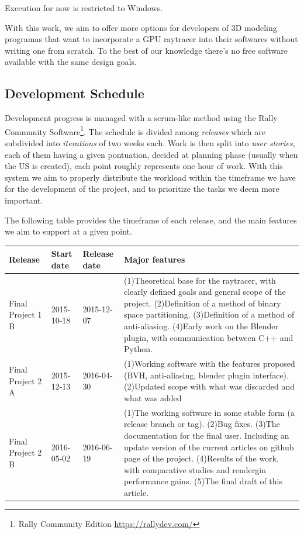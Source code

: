 \documentclass[a4paper]{sbgames}               %
\begin{document}
Execution for now is restricted to Windows.

With this work, we aim to offer more options for developers of 3D
modeling programas that want to incorporate a GPU raytracer into their
softwares without writing one from scratch. To the best of our
knowledge there's no free software available with the same design
goals.

\subsection{Development Schedule}

Development progress is managed with a scrum-like method using the
Rally Community Software\footnote{Rally Community Edition
 \url{https://rallydev.com/}}. The schedule is divided among
\emph{releases} which are subdivided into \emph{iterations} of two
weeks each. Work is then split into \emph{user stories}, each of them
having a given pontuation, decided at planning phase (usually when the
US is created), each point roughly represents one hour of work. With
this system we aim to properly distribute the workload within the
timeframe we have for the development of the project, and to
prioritize the tasks we deem more important.

The following table provides the timeframe of each release, and the
main features we aim to support at a given point.

\begin{tabular}{ | p{.8cm} | p{1cm} | p{1cm} | p{4cm} |}
  \hline
  Release & Start date & Release date & Major features \\ \hline
  Final Project 1 B & 2015-10-18 & 2015-12-07 & (1)Theoretical base for the raytracer, with clearly defined goals and
                                                general scope of the project. (2)Definition of a method of binary
                                                space partitioning. (3)Definition of a method of anti-aliasing.
                                                (4)Early work on the Blender plugin, with communication between C++ and Python. \\ \hline
  Final Project 2 A & 2015-12-13 & 2016-04-30 & (1)Working software with the features proposed (BVH, anti-aliasing, blender plugin interface).
                                                (2)Updated scope with what was discarded and what was added \\ \hline
  Final Project 2 B & 2016-05-02 & 2016-06-19 & (1)The working software in some stable form (a release branch or tag). (2)Bug fixes.
                                                (3)The documentation for the final user. Including an update version of
                                                the current articles on github page of the project. (4)Results of the work,
                                                with comparative studies and rendergin performance gains.
                                                (5)The final draft of this article. \\ \hline
\end{tabular}
\end{document}
